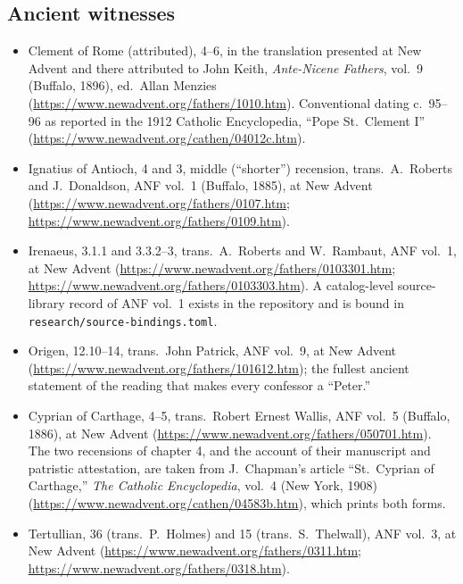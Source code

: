 \subsection*{Ancient witnesses}

\begin{itemize}
\item Clement of Rome (attributed),  4--6, in the translation presented at New Advent and there
attributed to John Keith, \textit{Ante-Nicene Fathers}, vol.~9 (Buffalo,
1896), ed.\ Allan Menzies
(\url{https://www.newadvent.org/fathers/1010.htm}).
Conventional dating c.~95--96 as reported in the 1912 Catholic
Encyclopedia, ``Pope St.~Clement I''
(\url{https://www.newadvent.org/cathen/04012c.htm}).
\item Ignatius of Antioch,  4 and  3, middle (``shorter'') recension, trans.\ A.~Roberts and
J.~Donaldson, ANF vol.~1 (Buffalo, 1885), at New Advent
(\url{https://www.newadvent.org/fathers/0107.htm};
\url{https://www.newadvent.org/fathers/0109.htm}).
\item Irenaeus,  3.1.1 and 3.3.2--3, trans.\
A.~Roberts and W.~Rambaut, ANF vol.~1, at New Advent
(\url{https://www.newadvent.org/fathers/0103301.htm};
\url{https://www.newadvent.org/fathers/0103303.htm}). A catalog-level
source-library record of ANF vol.~1 exists in the repository and is bound
in \texttt{research/source-bindings.toml}.
\item Origen,  12.10--14, trans.\ John Patrick,
ANF vol.~9, at New Advent (\url{https://www.newadvent.org/fathers/101612.htm});
the fullest ancient statement of the reading that makes every confessor a
``Peter.''
\item Cyprian of Carthage,  4--5,
trans.\ Robert Ernest Wallis, ANF vol.~5 (Buffalo, 1886), at New Advent
(\url{https://www.newadvent.org/fathers/050701.htm}). The two recensions of
chapter 4, and the account of their manuscript and patristic attestation,
are taken from J.~Chapman's article ``St.~Cyprian of Carthage,''
\textit{The Catholic Encyclopedia}, vol.~4 (New York, 1908)
(\url{https://www.newadvent.org/cathen/04583b.htm}), which prints both forms.
\item Tertullian, \work{The Prescription Against Heretics} 36 (trans.\
P.~Holmes) and  15 (trans.\ S.~Thelwall), ANF vol.~3, at
New Advent (\url{https://www.newadvent.org/fathers/0311.htm};
\url{https://www.newadvent.org/fathers/0318.htm}).

\end{itemize}
